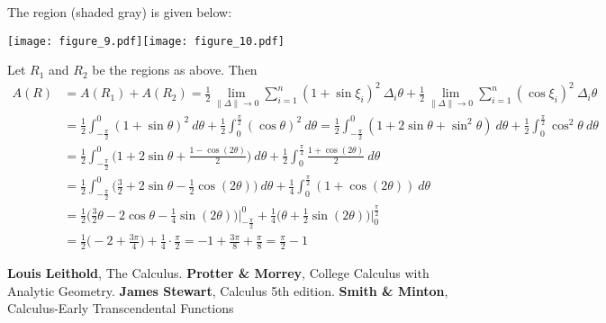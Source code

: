 \documentclass[12pt,twoside]{article}
\begin{document}
 The region (shaded gray) is given below:

\begin{center}
\texttt{[image: figure\_9.pdf]}\qquad \texttt{[image: figure\_10.pdf]}
\end{center}

Let $R_1$ and $R_2$ be the regions as above. Then
\begin{align*}
A(R) &= A(R_1)+A(R_2) = \frac{1}{2}\lim_{\|\Delta\|\to0}\sum_{i=1}^{n}(1+\sin\xi_i)^2\ \Delta_i\theta+ \frac{1}{2}\lim_{\|\Delta\|\to0}\sum_{i=1}^{n}(\cos\xi_i)^2\ \Delta_i\theta\\
&= \frac{1}{2}\int^{0}_{-\frac{\pi}{2}}(1+\sin\theta)^2\ d\theta+ \frac{1}{2}\int_{0}^{\frac{\pi}{2}}(\cos\theta)^2\ d\theta = \frac{1}{2}\int^{0}_{-\frac{\pi}{2}}(1+2\sin\theta+\sin^2\theta)\ d\theta+ \frac{1}{2}\int_{0}^{\frac{\pi}{2}}\cos^2\theta\ d\theta\\
&= \frac{1}{2}\int^{0}_{-\frac{\pi}{2}}\bigg(1+2\sin\theta+\frac{1-\cos(2\theta)}{2}\bigg)\ d\theta+ \frac{1}{2}\int_{0}^{\frac{\pi}{2}}\frac{1+\cos(2\theta)}{2}\ d\theta\\
&= \frac{1}{2}\int^{0}_{-\frac{\pi}{2}}\bigg(\frac{3}{2}+2\sin\theta-\frac{1}{2}\cos(2\theta)\bigg)\ d\theta+ \frac{1}{4}\int_{0}^{\frac{\pi}{2}}(1+\cos(2\theta))\ d\theta\\
&= \frac{1}{2}\bigg(\frac{3}{2}\theta-2\cos\theta-\frac{1}{4}\sin(2\theta)\bigg)\bigg|^{0}_{-\frac{\pi}{2}}+ \frac{1}{4}\bigg(\theta+\frac{1}{2}\sin(2\theta)\bigg)\bigg|_{0}^{\frac{\pi}{2}}\\
&= \frac{1}{2}\bigg(-2+\frac{3\pi}{4}\bigg)+ \frac{1}{4}\cdot\frac{\pi}{2}=-1+\frac{3\pi}{8}+\frac{\pi}{8}=  \frac{\pi}{2}-1
\end{align*}

\begin{thebibliography}{2}
 {\bf Louis Leithold}, The Calculus.
 {\bf Protter \& Morrey}, College Calculus with Analytic Geometry.
 {\bf James Stewart}, Calculus 5th edition.
 {\bf Smith \& Minton}, Calculus-Early Transcendental Functions
\end{thebibliography}
\end{document}
